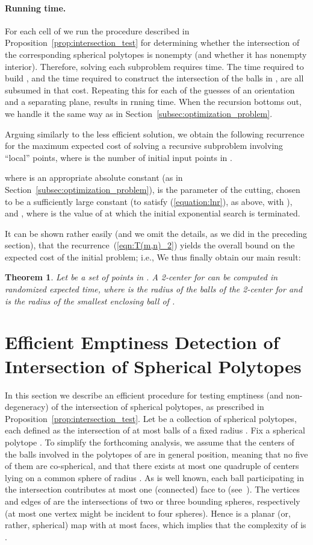 \documentclass[a4paper,12pt]{article}
\newtheorem{theorem}{Theorem}[section]
\begin{document}
\paragraph{Running time.}
For each cell of  we run the procedure described in
Proposition~\ref{prop:intersection_test} for determining whether the
intersection of the corresponding spherical polytopes is nonempty
(and whether it has nonempty interior). Therefore, solving each
subproblem requires  time. The  time
required to build , and the  time required to
construct the intersection of the balls in , are all subsumed in that cost. Repeating this for
each of the  guesses of an orientation and a
separating plane, results in 
rnning time. When the recursion bottoms out, we handle it the same
way as in Section~\ref{subsec:optimization_problem}.

Arguing similarly to the less efficient solution, we obtain the
following recurrence for the maximum expected cost  of
solving a recursive subproblem involving  ``local'' points, where
 is the number of initial input points in .


where  is an appropriate absolute constant (as in
Section~\ref{subsec:optimization_problem}),  is the
parameter of the cutting, chosen to be a sufficiently large constant
(to satisfy (\ref{equation:lnr}), as above, with ), and
, where  is the value of  at
which the initial exponential search is terminated.

It can be shown rather easily (and we omit the details, as we did in
the preceding section), that the recurrence~(\ref{eqn:T(m,n)_2})
yields the overall bound  on
the expected cost of the initial problem; i.e.,
 We thus finally obtain
our main result:
\begin{theorem}
Let  be a set of  points in . A 2-center for 
can be computed in  randomized
expected time, where  is the radius of the balls of the
2-center for  and  is the radius of the smallest enclosing
ball of .
\end{theorem}

\section{Efficient Emptiness Detection of Intersection of Spherical
Polytopes} \label{sec:spherical_polytopes} In this section we
describe an efficient procedure for testing emptiness (and
non-degeneracy) of the intersection of spherical polytopes, as
prescribed in Proposition~\ref{prop:intersection_test}. Let  be
a collection of spherical polytopes, each defined as the
intersection of at most  balls of a fixed radius . Fix a
spherical polytope . To simplify the forthcoming analysis,
we assume that the centers of the balls involved in the polytopes of
 are in general position, meaning that no five of them are
co-spherical, and that there exists at most one quadruple of centers
lying on a common sphere of radius . As is well known, each ball
 participating in the intersection  contributes at most one
(connected) face to  (see~\cite{ER}). The vertices and edges
of  are the intersections of two or three bounding spheres,
respectively (at most one vertex might be incident to four spheres).
Hence  is a planar (or, rather, spherical) map with at most
 faces, which implies that the complexity of  is
.
\end{document}
